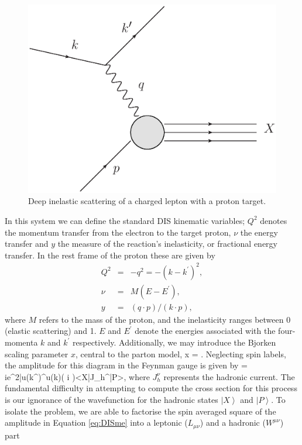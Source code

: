 \begin{figure}[ht]
\centering
\includegraphics[scale=0.5]{2-PDFs/figs/DIS.eps}
\caption{Deep inelastic scattering of a charged lepton with a proton target.}
\label{fig:DIS}
\end{figure}
In this system we can define the standard DIS kinematic variables;  $Q^2$ denotes the momentum transfer from the electron to the target proton, $\nu$ the energy transfer and $y$ the measure of the reaction's inelasticity, or fractional energy transfer. In the rest frame of the proton these are given by
\begin{eqnarray}
 Q^2 &=& -q^2 = -(k - k^{\prime})^2, \\
 \nu &=& M(E- E^\prime), \\
 y &=& (q \cdot p)/(k \cdot p),
\end{eqnarray}
where $M$ refers to the mass of the proton, and the inelasticity ranges between 0 (elastic scattering) and 1. $E$ and $E^\prime$ denote the energies associated with the four-momenta $k$ and $k^\prime$ respectively. Additionally, we may introduce the Bjorken scaling parameter $x$, central to the parton model,
\be x = . \ee
Neglecting spin labels, the amplitude for this diagram in the Feynman gauge is given by
\be{} = ie^2\bar{u}(k^\prime)\gamma^\mu u(k)\left( i \right)\left<X\right|J_h^\nu\left|P\right>,  \label{eq:DISme}\ee
%
where $J_h^\nu$ represents the hadronic current. 
The fundamental difficulty in attempting to compute the cross section for this process is our ignorance of the wavefunction for the hadronic states $\left|X\right>$ and $\left|P\right>$. To isolate the problem, we are able to factorise the spin averaged square of the amplitude in Equation \ref{eq:DISme} into a leptonic ($L_{\mu\nu}$) and a hadronic ($W^{\mu\nu}$) part
